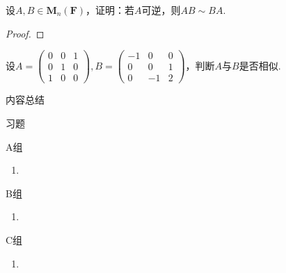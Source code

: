 \begin{example}{}{}
    设$A,B\in \mathbf{M}_n(\mathbf{F})$，证明：若$A$可逆，则$AB\sim BA$.
\end{example}

\begin{proof}

\end{proof}

\begin{example}{}{}
    设$A=\begin{pmatrix}
            0 & 0 & 1 \\ 0 & 1 & 0 \\ 1 & 0 & 0
        \end{pmatrix},B=\begin{pmatrix}
            -1 & 0 & 0 \\ 0 & 0 & 1 \\ 0 & -1 & 2
        \end{pmatrix}$，判断$A$与$B$是否相似.
\end{example}

\begin{solution}

\end{solution}

\vspace{2ex}
\centerline{\heiti \Large 内容总结}

\vspace{2ex}
\centerline{\heiti \Large 习题}

\vspace{2ex}
{\kaishu }
\begin{flushright}
    \kaishu

\end{flushright}

\centerline{\heiti A组}
\begin{enumerate}
    \item
\end{enumerate}

\centerline{\heiti B组}
\begin{enumerate}
    \item
\end{enumerate}

\centerline{\heiti C组}
\begin{enumerate}
    \item
\end{enumerate}
